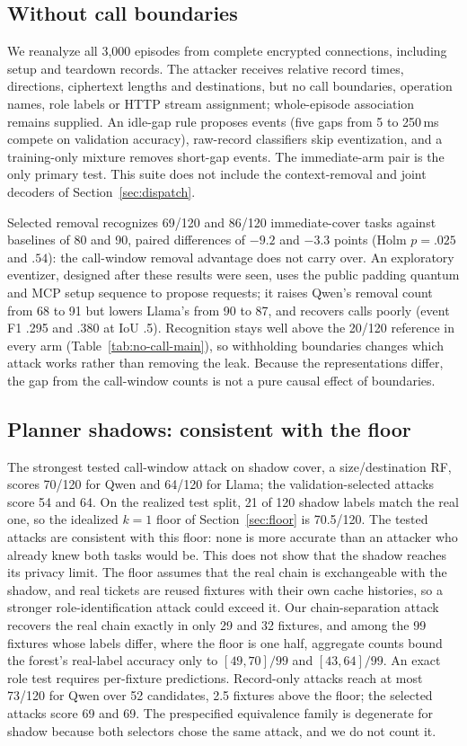 \subsection{Without call boundaries}\label{sec:noboundary}
We reanalyze all 3,000 episodes from complete encrypted connections, including setup and teardown records. The attacker receives relative record times, directions, ciphertext lengths and destinations, but no call boundaries, operation names, role labels or HTTP stream assignment; whole-episode association remains supplied. An idle-gap rule proposes events (five gaps from 5 to 250\,ms compete on validation accuracy), raw-record classifiers skip eventization, and a training-only mixture removes short-gap events. The immediate-arm pair is the only primary test. This suite does not include the context-removal and joint decoders of Section~\ref{sec:dispatch}.


Selected removal recognizes 69/120 and 86/120 immediate-cover tasks against baselines of 80 and 90, paired differences of $-9.2$ and $-3.3$ points (Holm $p=.025$ and $.54$): the call-window removal advantage does not carry over. An exploratory eventizer, designed after these results were seen, uses the public padding quantum and MCP setup sequence to propose requests; it raises Qwen's removal count from 68 to 91 but lowers Llama's from 90 to 87, and recovers calls poorly (event F1 .295 and .380 at IoU .5). Recognition stays well above the 20/120 reference in every arm (Table~\ref{tab:no-call-main}), so withholding boundaries changes which attack works rather than removing the leak. Because the representations differ, the gap from the call-window counts is not a pure causal effect of boundaries.

\subsection{Planner shadows: consistent with the floor}\label{sec:shadow}
The strongest tested call-window attack on shadow cover, a size/destination RF, scores 70/120 for Qwen and 64/120 for Llama; the validation-selected attacks score 54 and 64. On the realized test split, 21 of 120 shadow labels match the real one, so the idealized $k=1$ floor of Section~\ref{sec:floor} is 70.5/120. The tested attacks are consistent with this floor: none is more accurate than an attacker who already knew both tasks would be. This does not show that the shadow reaches its privacy limit. The floor assumes that the real chain is exchangeable with the shadow, and real tickets are reused fixtures with their own cache histories, so a stronger role-identification attack could exceed it. Our chain-separation attack recovers the real chain exactly in only 29 and 32 fixtures, and among the 99 fixtures whose labels differ, where the floor is one half, aggregate counts bound the forest's real-label accuracy only to $[49,70]/99$ and $[43,64]/99$. An exact role test requires per-fixture predictions. Record-only attacks reach at most 73/120 for Qwen over 52 candidates, 2.5 fixtures above the floor; the selected attacks score 69 and 69. The prespecified equivalence family is degenerate for shadow because both selectors chose the same attack, and we do not count it.

